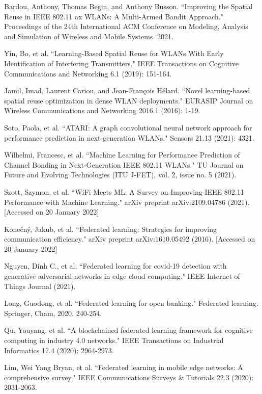 \documentclass[10pt,a4paper,twocolumn]{article}
\begin{document}
\begin{thebibliography}{9}
 Bardou, Anthony, Thomas Begin, and Anthony Busson. ``Improving the Spatial Reuse in IEEE 802.11 ax WLANs: A Multi-Armed Bandit Approach." Proceedings of the 24th International ACM Conference on Modeling, Analysis and Simulation of Wireless and Mobile Systems. 2021.

 Yin, Bo, et al. ``Learning-Based Spatial Reuse for WLANs With Early Identification of Interfering Transmitters." IEEE Transactions on Cognitive Communications and Networking 6.1 (2019): 151-164.

 Jamil, Imad, Laurent Cariou, and Jean-François Hélard. ``Novel learning-based spatial reuse optimization in dense WLAN deployments." EURASIP Journal on Wireless Communications and Networking 2016.1 (2016): 1-19.

 Soto, Paola, et al. ``ATARI: A graph convolutional neural network approach for performance prediction in next-generation WLANs." Sensors 21.13 (2021): 4321.

 Wilhelmi, Francesc, et al. ``Machine Learning for Performance Prediction of Channel Bonding in Next-Generation IEEE 802.11 WLANs." TU Journal on Future and Evolving Technologies (ITU J-FET), vol. 2, issue no. 5 (2021).

 Szott, Szymon, et al. ``WiFi Meets ML: A Survey on Improving IEEE 802.11 Performance with Machine Learning." arXiv preprint arXiv:2109.04786 (2021). [Accessed on 20 January 2022] 

 Konečný, Jakub, et al. ``Federated learning: Strategies for improving communication efficiency." arXiv preprint arXiv:1610.05492 (2016). [Accessed on 20 January 2022] 

 Nguyen, Dinh C., et al. ``Federated learning for covid-19 detection with generative adversarial networks in edge cloud computing." IEEE Internet of Things Journal (2021).

 Long, Guodong, et al. ``Federated learning for open banking." Federated learning. Springer, Cham, 2020. 240-254.

 Qu, Youyang, et al. ``A blockchained federated learning framework for cognitive computing in industry 4.0 networks." IEEE Transactions on Industrial Informatics 17.4 (2020): 2964-2973.

 Lim, Wei Yang Bryan, et al. ``Federated learning in mobile edge networks: A comprehensive survey." IEEE Communications Surveys \& Tutorials 22.3 (2020): 2031-2063.


\end{thebibliography}
\end{document}

